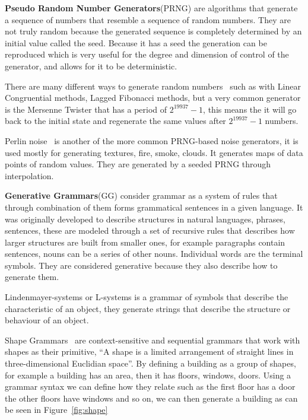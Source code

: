 \documentclass[runningheads]{llncs}
\begin{document}

\textbf{Pseudo Random Number Generators}(PRNG) are algorithms that generate a sequence of numbers that resemble a sequence of random numbers. They are not truly random because the generated sequence is completely determined by an initial value called the seed. Because it has a seed the generation can be reproduced which is very useful for the degree and dimension of control of the generator, and allows for it to be deterministic. 

There are many different ways to generate random numbers~\cite{ref_verth} such as with Linear Congruential methods, Lagged Fibonacci methods, but a very common generator is the Mersenne Twister that has a period of $2^{19937}-1$, this means the it will go back to the initial state and regenerate the same values after $2^{19937}-1$ numbers.

Perlin noise~\cite{ref_perlin} is another of the more common PRNG-based noise generators, it is used mostly for generating textures, fire, smoke, clouds. It generates maps of data points of random values. They are generated by a seeded PRNG through interpolation.

\textbf{Generative Grammars}(GG) consider grammar as a system of rules that through combination of them forms grammatical sentences in a given language. It was originally developed to describe structures in natural languages, phrases, sentences, these are modeled through a set of recursive rules that describes how larger structures are built from smaller ones, for example paragraphs contain sentences, nouns can be a series of other nouns. Individual words are the terminal symbols. They are considered generative because they also describe how to generate them.

Lindenmayer-systems or L-systems is a grammar of symbols that describe the characteristic of an object, they generate strings that describe the structure or behaviour of an object.

Shape Grammars~\cite{ref_stiny} are context-sensitive and sequential grammars that work with shapes as their primitive, ``A shape is a limited arrangement of straight lines in three-dimensional Euclidian space''. By defining a building as a group of shapes, for example a building has an area, then it has floors, windows, doors. Using a grammar syntax we can define how they relate  such as the first floor has a door the other floors have windows and so on, we can then generate a building as can be seen in Figure~\ref{fig:shape}
\end{document}
